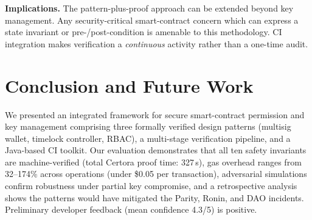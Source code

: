 \documentclass[conference]{IEEEtran}
\begin{document}
\textbf{Implications.}  The pattern-plus-proof approach can be
extended beyond key management.  Any security-critical smart-contract
concern which can express a state invariant or pre-/post-condition
is amenable to this methodology.  CI integration makes verification a
\emph{continuous} activity rather than a one-time audit.

\section{Conclusion and Future Work}
\label{sec:conclusion}

We presented an integrated framework for secure smart-contract
permission and key management comprising three formally verified
design patterns (multisig wallet, timelock controller, RBAC), a
multi-stage verification pipeline, and a Java-based CI toolkit.  Our
evaluation demonstrates that all ten safety invariants are
machine-verified (total Certora proof time: 327\,s), gas overhead
ranges from 32--174\% across operations (under \$0.05 per transaction),
adversarial simulations confirm robustness under partial key
compromise, and a retrospective analysis shows the patterns would have
mitigated the Parity, Ronin, and DAO incidents.  Preliminary developer
feedback (mean confidence 4.3/5) is positive.


% 
% 
\end{document}
